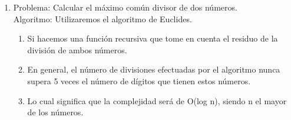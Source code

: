 \documentclass{article}
\begin{document}
\begin{enumerate}
\begin{enumerate}
\[\begin{bmatrix}
			1 & 0
		\end{bmatrix}
		\]
		es fácil demostrar por inducción que están relacionadas doblemente con la sucesión de Fibonacci, por la igualdad
		\begin{center}
		\[
		$\begin{bmatrix}
			1 & 1 \\
			1 & 0
		\end{bmatrix}^{n-1}$ = 
		\begin{bmatrix}
		F_{n} & F_{n-1} \\
		F_{n-1} & F_{n-2}
		\end{bmatrix}
		\]
		\end{center}
		Por tanto, aplicando el algoritmo de la exponenciación rápida a la matriz es posible calcular el n-ésimo término de la sucesión en $log_{2}$(n) iteraciones, por lo que la complejidad sería de O($log_{2}$(n))
	\end{enumerate}
	\item Problema: Calcular el máximo común divisor de dos números.\\Algoritmo: Utilizaremos el algoritmo de Euclides.
	\begin{enumerate}
		\item Si hacemos una función recursiva que tome en cuenta el residuo de la división de ambos números.  
		\item En general, el número de divisiones efectuadas por el algoritmo nunca supera 5 veces el número de dígitos que tienen estos números.
		\item Lo cual significa que la complejidad será de O(log n), siendo n el mayor de los números. 
	\end{enumerate}
\end{enumerate}
\end{document}
